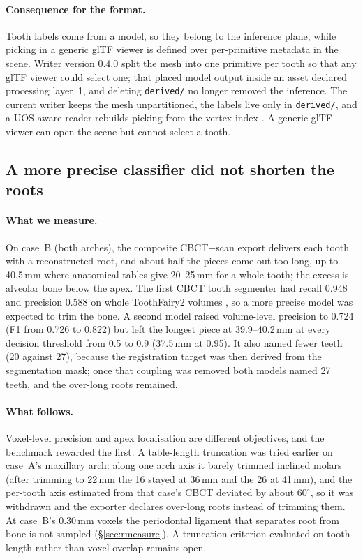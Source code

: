 \documentclass[11pt,a4paper]{article}
\newcommand{\code}[1]{\texttt{\small #1}}
\begin{document}
\paragraph{Consequence for the format.} Tooth labels come from a model, so they belong to
the inference plane, while picking in a generic glTF viewer is defined over per-primitive
metadata in the scene. Writer version 0.4.0 split the mesh into one primitive per tooth so
that any glTF viewer could select one; that placed model output inside an asset declared
processing layer~1, and deleting \code{derived/} no longer removed the inference. The current
writer keeps the mesh unpartitioned, the labels live only in \code{derived/}, and a UOS-aware
reader rebuilds picking from the vertex index \cite{uosspec}. A generic glTF viewer can open
the scene but cannot select a tooth.

\subsection{A more precise classifier did not shorten the roots}

\paragraph{What we measure.} On case~B (both arches), the composite CBCT$+$scan export
delivers each tooth with a reconstructed root, and about half the pieces come out too long,
up to 40.5\,mm where anatomical tables give 20--25\,mm for a whole tooth; the excess is
alveolar bone below the apex. The first CBCT tooth segmenter had recall 0.948 and precision
0.588 on whole ToothFairy2 volumes \cite{toothfairy2}, so a more precise model was expected to
trim the bone. A second model raised volume-level precision to 0.724 (F1 from 0.726 to 0.822)
but left the longest piece at 39.9--40.2\,mm at every decision threshold from 0.5 to 0.9
(37.5\,mm at 0.95). It also named fewer teeth (20
against 27), because the registration target was then derived from the segmentation mask;
once that coupling was removed both models named 27 teeth, and the over-long roots remained.

\paragraph{What follows.} Voxel-level precision and apex localisation are different
objectives, and the benchmark rewarded the first. A table-length truncation was tried earlier on case~A's maxillary
arch: along one arch axis it barely trimmed inclined molars (after trimming to 22\,mm the 16
stayed at 36\,mm and the 26 at 41\,mm), and the per-tooth axis estimated from that case's CBCT
deviated by about $60^\circ$, so it was withdrawn and the exporter declares over-long roots
instead of trimming them. At case~B's 0.30\,mm voxels the periodontal ligament that separates root from bone is not
sampled (\S\ref{sec:rmeasure}). A truncation criterion
evaluated on tooth length rather than voxel overlap remains open.
\end{document}
